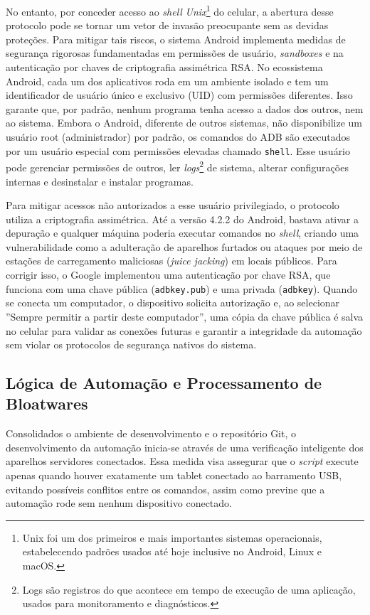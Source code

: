 \documentclass[
    12pt,
    openright,
    oneside,
    a4paper,
    english,
    brazilian
    ]{abntex2}
\begin{document}
No entanto, por conceder acesso ao \textit{shell} \textit{Unix}\footnote{Unix foi um dos primeiros e mais importantes sistemas operacionais, estabelecendo padrões usados até hoje inclusive no Android, Linux e macOS.} do celular, a abertura desse protocolo pode se tornar um vetor de invasão preocupante sem as devidas proteções. Para mitigar tais riscos, o sistema Android implementa medidas de segurança rigorosas fundamentadas em permissões de usuário, \textit{sandboxes} e na autenticação por chaves de criptografia assimétrica RSA. No ecossistema Android, cada um dos aplicativos roda em um ambiente isolado e tem um identificador de usuário único e exclusivo (UID) com permissões diferentes. Isso garante que, por padrão, nenhum programa tenha acesso a dados dos outros, nem ao sistema. Embora o Android, diferente de outros sistemas, não disponibilize um usuário root (administrador) por padrão, os comandos do ADB são executados por um usuário especial com permissões elevadas chamado \texttt{shell}. Esse usuário pode gerenciar permissões de outros, ler \textit{logs}\footnote{Logs são registros do que acontece em tempo de execução de uma aplicação, usados para monitoramento e diagnósticos.} de sistema, alterar configurações internas e desinstalar e instalar programas.

Para mitigar acessos não autorizados a esse usuário privilegiado, o protocolo utiliza a criptografia assimétrica. Até a versão 4.2.2 do Android, bastava ativar a depuração e qualquer máquina poderia executar comandos no \textit{shell}, criando uma vulnerabilidade como a adulteração de aparelhos furtados ou ataques por meio de estações de carregamento maliciosas (\textit{juice jacking}) em locais públicos. Para corrigir isso, o Google implementou uma autenticação por chave RSA, que funciona com uma chave pública (\texttt{adbkey.pub}) e uma privada (\texttt{adbkey}). Quando se conecta um computador, o dispositivo solicita autorização e, ao selecionar ''Sempre permitir a partir deste computador'', uma cópia da chave pública é salva no celular para validar as conexões futuras e garantir a integridade da automação sem violar os protocolos de segurança nativos do sistema. 

\subsection{Lógica de Automação e Processamento de Bloatwares}
Consolidados o ambiente de desenvolvimento e o repositório Git, o desenvolvimento da automação inicia-se através de uma verificação inteligente dos aparelhos servidores conectados. Essa medida visa assegurar que o \textit{script} execute apenas quando houver exatamente um tablet conectado ao barramento USB, evitando possíveis conflitos entre os comandos, assim como previne que a automação rode sem nenhum dispositivo conectado.
\end{document}
